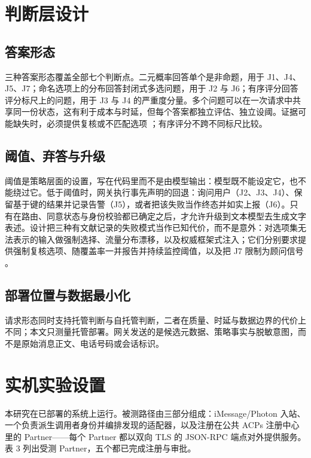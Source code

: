 \documentclass[11pt,a4paper]{article}
\begin{document}
\section{判断层设计}

\subsection{答案形态}

三种答案形态覆盖全部七个判断点。二元概率回答单个是非命题，用于 J1、J4、J5、J7；命名选项上的分布回答封闭式多选问题，用于 J2 与 J6；有序评分回答评分标尺上的问题，用于 J3 与 J4 的严重度分量。多个问题可以在一次请求中共享同一份状态，这有利于成本与时延，但每个答案都独立评估、独立设阈。证据可能缺失时，必须提供复核或不匹配选项 \cite{geifman2017selective}；有序评分不跨不同标尺比较。

\subsection{阈值、弃答与升级}

阈值是策略层面的设置，写在代码里而不是由模型输出：模型既不能设定它，也不能绕过它。低于阈值时，网关执行事先声明的回退：询问用户（J2、J3、J4）、保留基于键的结果并记录告警（J5），或者把该失败当作终态并如实上报（J6）。只有在路由、同意状态与身份校验都已确定之后，才允许升级到文本模型去生成文字表述。设计把三种有文献记录的失败模式当作已知代价，而不是意外：对选项集无法表示的输入做强制选择、流量分布漂移，以及权威框架式注入；它们分别要求提供强制复核选项、随覆盖率一并报告并持续监控阈值，以及把 J7 限制为顾问信号 \cite{geifman2017selective,greshake2023indirect}。

\subsection{部署位置与数据最小化}

请求形态同时支持托管判断与自托管判断，二者在质量、时延与数据边界的代价上不同；本文只测量托管部署。网关发送的是候选元数据、策略事实与脱敏意图，而不是原始消息正文、电话号码或会话标识。

\section{实机实验设置}

本研究在已部署的系统上运行。被测路径由三部分组成：iMessage/Photon 入站、一个负责派生调用者身份并编排发现的适配器，以及注册在公共 ACPs 注册中心里的 Partner------每个 Partner 都以双向 TLS 的 JSON-RPC 端点对外提供服务。表 3 列出受测 Partner，五个都已完成注册与审批。
\end{document}
